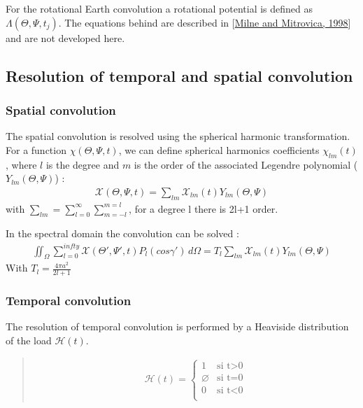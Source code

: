 \documentclass[letterpaper,10pt,english]{sphinxmanual}
\begin{document}
\sphinxAtStartPar
For the rotational Earth convolution a rotational potential is defined as \(\Lambda(\Theta,\Psi,t_j)\). The equations behind are described in {[}\hyperlink{cite.index:id8}{Milne and Mitrovica, 1998}{]} and are not developed here.


\subsection{Resolution of temporal and spatial convolution}
\label{\detokenize{Theory:resolution-of-temporal-and-spatial-convolution}}

\subsubsection{Spatial convolution}
\label{\detokenize{Theory:spatial-convolution}}
\sphinxAtStartPar
The spatial convolution is resolved using the spherical harmonic transformation. For a function \(\chi(\Theta,\Psi,t)\), we can define spherical harmonics coefficients \(\chi_{lm}(t)\), where \(l\) is the degree and \(m\) is the order of the associated Legendre polynomial (\(Y_{lm}(\Theta,\Psi)\)) :
\begin{equation*}
\begin{split}\mathcal{X} (\Theta,\Psi,t)=\sum_{lm} \mathcal{X} _{lm}(t)Y_{lm}(\Theta,\Psi)\end{split}
\end{equation*}
\sphinxAtStartPar
with \(\sum_{lm}=\sum_{l=0}^{\infty} \sum_{m=-l}^{m=l}\), for a degree l there is 2l+1 order.

\sphinxAtStartPar
In the spectral domain the convolution can be solved :
\begin{equation*}
\begin{split}\iint _{\Omega} \sum_{l=0}^{infty} \mathcal{X} (\Theta',\Psi',t)P_l(cos\gamma') \,d \Omega = T_l \sum_{lm} \mathcal{X} _{lm} (t) Y_{lm}(\Theta,\Psi)\end{split}
\end{equation*}\label{\detokenize{Theory:t-definition}}
\sphinxAtStartPar
With \(T_l = \frac{4\pi a^2}{2l+1}\)


\subsubsection{Temporal convolution}
\label{\detokenize{Theory:temporal-convolution}}
\sphinxAtStartPar
The resolution of temporal convolution is performed by a Heaviside distribution of the load \(\mathcal{H} (t)\).
\begin{quote}
\begin{equation*}
\begin{split}\mathcal{H} (t) = \left\{
    \begin{array}{ll}
        1 & \mbox{si t>0} \\
        \varnothing   & \mbox{si t=0} \\
        0 & \mbox{si t<0} \\
    \end{array}
\right.\end{split}
\end{equation*}\end{quote}
\end{document}
